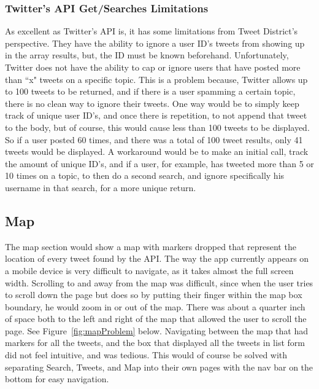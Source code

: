 \documentclass[11pt]{article}
\begin{document}
\subsubsection{Twitter's API Get/Searches Limitations}

As excellent as Twitter's API is, it has some limitations from Tweet District's perspective. They have the ability to ignore a user ID's tweets from showing up in the array results, but, the ID must be known beforehand. Unfortunately, Twitter does not have the ability to cap or ignore users that have posted more than ``x" tweets on a specific topic. This is a problem because, Twitter allows up to 100 tweets to be returned, and if there is a user spamming a certain topic, there is no clean way to ignore their tweets. One way would be to simply keep track of unique user ID's, and once there is repetition, to not append that tweet to the body, but of course, this would cause less than 100 tweets to be displayed. So if a user posted 60 times, and there was a total of 100 tweet results, only 41 tweets would be displayed. A workaround would be to make an initial call, track the amount of unique ID's, and if a user, for example, has tweeted more than 5 or 10 times on a topic, to then do a second search, and ignore specifically his username in that search, for a more unique return.


\subsection{Map}
The map section would show a map with markers dropped that represent the location of every tweet found by the API. The way the app currently appears on a mobile device is very difficult to navigate, as it takes almost the full screen width. Scrolling to and away from the map was difficult, since when the user tries to scroll down the page but does so by putting their finger within the map box boundary, he would zoom in or out of the map. There was about a quarter inch of space both to the left and right of the map that allowed the user to scroll the page.  See Figure~\ref{fig:mapProblem} below. Navigating between the map that had markers for all the tweets, and the box that displayed all the tweets in list form did not feel intuitive, and was tedious. This would of course be solved with separating Search, Tweets, and Map into their own pages with the nav bar on the bottom for easy navigation.
\end{document}
